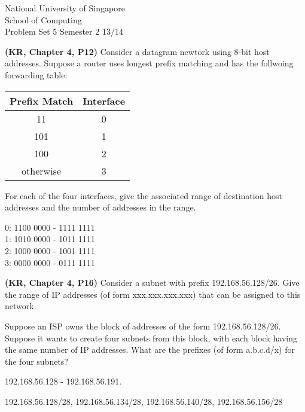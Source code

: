 \documentclass[a4paper,11pt]{exam}
\begin{document}
    \extraheadheight{.5in}
    {\large\sf National University of Singapore\\ School of Computing \\
    \LARGE\sf Problem Set 5}%
    {\large\sf Semester 2 13/14}
    \firstpageheadrule
    \pagestyle{headandfoot}

    \begin{questions}
	\question \textbf{(KR, Chapter 4, P12)}
	Consider a datagram newtork using 8-bit host addresses. Suppose a 
	router uses longest prefix matching and has the follwoing forwarding
	table:

	\begin{center}
	\begin{tabular}{cc}
			Prefix Match & Interface\\
			\hline
			11 & 0\\
			101 & 1\\
			100 & 2\\
			otherwise & 3\\
			\hline
	\end{tabular}
	\end{center}

	For each of the four interfaces, give the associated range of 
	destination host addresses and the number of addresses in the range.

	\begin{solution}

			0: 1100 0000 - 1111 1111\\
			1: 1010 0000 - 1011 1111\\
			2: 1000 0000 - 1001 1111\\
			3: 0000 0000 - 0111 1111\\

	\end{solution}

	\question \textbf{(KR, Chapter 4, P16)}
	Consider a subnet with prefix 192.168.56.128/26.  Give the
	range of IP addresses (of form xxx.xxx.xxx.xxx) that can
	be assigned to this network.

	Suppose an ISP owns the block of addresses of the form
	192.168.56.128/26.  Suppose it wants to create four subnets
	from this block, with each block having the same number of
	IP addresses.  What are the prefixes (of form a.b.c.d/x)
	for the four subnets?

	\begin{solution}
		192.168.56.128 - 192.168.56.191.

		192.168.56.128/28, 192.168.56.134/28, 192.168.56.140/28, 192.168.56.156/28
	\end{solution}


\end{questions}
\end{document}
